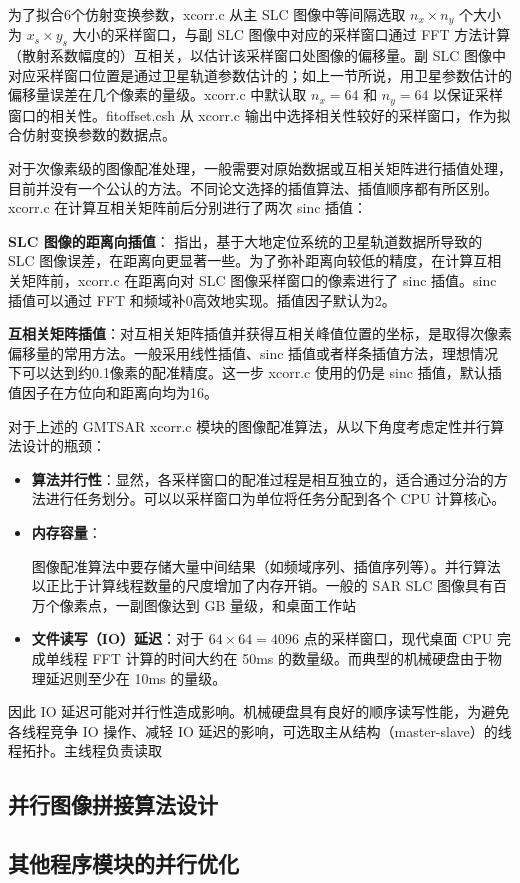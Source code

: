 为了拟合6个仿射变换参数，xcorr.c 从主 SLC 图像中等间隔选取 $n_x \times n_y $ 个大小为 $x_s \times y_s$ 大小的采样窗口，与副 SLC 图像中对应的采样窗口通过 FFT 方法计算（散射系数幅度的）互相关，以估计该采样窗口处图像的偏移量。副 SLC 图像中对应采样窗口位置是通过卫星轨道参数估计的；如上一节所说，用卫星参数估计的偏移量误差在几个像素的量级。xcorr.c 中默认取 $n_x=64$ 和 $n_y=64$ 以保证采样窗口的相关性。fitoffset.csh 从 xcorr.c 输出中选择相关性较好的采样窗口，作为拟合仿射变换参数的数据点。

对于次像素级的图像配准处理，一般需要对原始数据或互相关矩阵进行插值处理，目前并没有一个公认的方法。不同论文选择的插值算法、插值顺序都有所区别\cite{li2008image}\cite{hanssen1999evaluation}。xcorr.c 在计算互相关矩阵前后分别进行了两次 sinc 插值：

\textbf{SLC 图像的距离向插值}：\citet{sandwell2011gmtsar} 指出，基于大地定位系统的卫星轨道数据所导致的 SLC 图像误差，在距离向更显著一些。为了弥补距离向较低的精度，在计算互相关矩阵前，xcorr.c 在距离向对 SLC 图像采样窗口的像素进行了 sinc 插值。sinc 插值可以通过 FFT 和频域补0高效地实现。插值因子默认为2。

\textbf{互相关矩阵插值}：对互相关矩阵插值并获得互相关峰值位置的坐标，是取得次像素偏移量的常用方法。一般采用线性插值、sinc 插值或者样条插值方法，理想情况下可以达到约0.1像素的配准精度\cite{li2008image}。这一步 xcorr.c 使用的仍是 sinc 插值，默认插值因子在方位向和距离向均为16。

对于上述的 GMTSAR xcorr.c 模块的图像配准算法，从以下角度考虑定性并行算法设计的瓶颈：

\begin{itemize}
    \item \textbf{算法并行性}：显然，各采样窗口的配准过程是相互独立的，适合通过分治的方法进行任务划分。可以以采样窗口为单位将任务分配到各个 CPU 计算核心。
    \item \textbf{内存容量}：
        
        图像配准算法中要存储大量中间结果（如频域序列、插值序列等）。并行算法以正比于计算线程数量的尺度增加了内存开销。一般的 SAR SLC 图像具有百万个像素点，一副图像达到 GB 量级，和桌面工作站
    \item \textbf{文件读写（IO）延迟}：对于 $64 \times 64 = 4096$ 点的采样窗口，现代桌面 CPU 完成单线程 FFT 计算的时间大约在 50ms 的数量级\cite{fftwbench}。而典型的机械硬盘由于物理延迟则至少在 10ms 的量级\cite{wiki:hddcharacter}。
\end{itemize}

因此 IO 延迟可能对并行性造成影响。机械硬盘具有良好的顺序读写性能，为避免各线程竞争 IO 操作、减轻 IO 延迟的影响，可选取主从结构（master-slave）的线程拓扑。主线程负责读取




\subsection{并行图像拼接算法设计}

\subsection{其他程序模块的并行优化}
